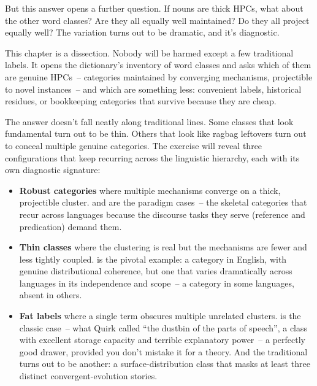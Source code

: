 But this answer opens a further question. If nouns are thick HPCs, what about the other word classes? Are they all equally well maintained? Do they all project equally well? The variation turns out to be dramatic, and it's diagnostic.

This chapter is a dissection. Nobody will be harmed except a few traditional labels. It opens the dictionary's inventory of word classes and asks which of them are genuine HPCs~-- categories maintained by converging mechanisms, projectible to novel instances~-- and which are something less: convenient labels, historical residues, or bookkeeping categories that survive because they are cheap.

The answer doesn't fall neatly along traditional lines. Some classes that look fundamental turn out to be thin. Others that look like ragbag leftovers turn out to conceal multiple genuine categories. The exercise will reveal three configurations that keep recurring across the linguistic hierarchy, each with its own diagnostic signature:

\begin{itemize}
    \item \textbf{Robust categories} where multiple mechanisms converge on a thick, projectible cluster.  and  are the paradigm cases~-- the skeletal categories that recur across languages because the discourse tasks they serve (reference and predication) demand them.
    \item \textbf{Thin classes} where the clustering is real but the mechanisms are fewer and less tightly coupled.  is the pivotal example: a category in English, with genuine distributional coherence, but one that varies dramatically across languages in its independence and scope~-- a category in some languages, absent in others.
    \item \textbf{Fat labels} where a single term obscures multiple unrelated clusters.  is the classic case~-- what Quirk called \enquote{the dustbin of the parts of speech}, a class with excellent storage capacity and terrible explanatory power~-- a perfectly good drawer, provided you don't mistake it for a theory. And the traditional  turns out to be another: a surface-distribution class that masks at least three distinct convergent-evolution stories.
\end{itemize}


